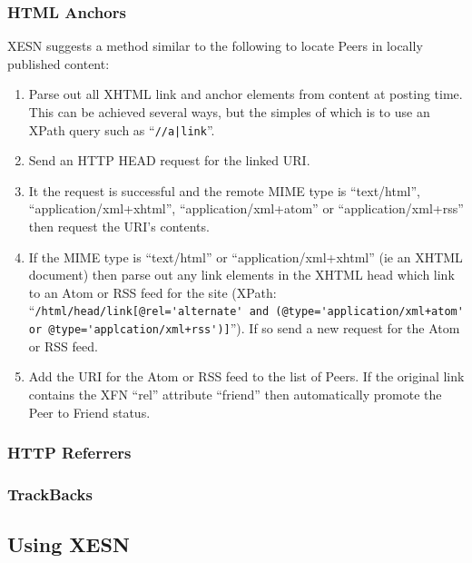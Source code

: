 \documentclass[titlepage,english,a4paper,twoside,dvips]{article}
\begin{document}
\subsubsection{HTML Anchors}

XESN suggests a method similar to the following to locate Peers in locally published content:

\begin{enumerate}

\item Parse out all XHTML link and anchor elements from content at posting time.  This can be achieved several ways, but the simples of which is to use an XPath query such as ``\verb+//a|link+''.

\item Send an HTTP HEAD request for the linked URI.

\item It the request is successful and the remote MIME type is ``text/html'', ``application/xml+xhtml'', ``application/xml+atom'' or ``application/xml+rss'' then request the URI's contents.

\item If the MIME type is ``text/html'' or ``application/xml+xhtml'' (ie an XHTML document) then parse out any link elements in the XHTML head which link to an Atom or RSS feed for the site (XPath: ``\verb|/html/head/link[@rel='alternate' and (@type='application/xml+atom' or @type='applcation/xml+rss')]|'').  If so send a new request for the Atom or RSS feed.

\item Add the URI for the Atom or RSS feed to the list of Peers.  If the original link contains the XFN ``rel'' attribute ``friend'' then automatically promote the Peer to Friend status.

\end{enumerate}


\subsubsection{HTTP Referrers}

\subsubsection{TrackBacks}

\subsection{Using XESN}
\end{document}
